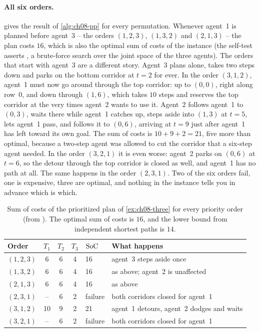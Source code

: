 \paragraph{All six orders.}  gives the result of
\cref{alg:ch08-pp} for every permutation. Whenever agent~1 is planned before agent~3
-- the orders $(1,2,3)$, $(1,3,2)$ and $(2,1,3)$ -- the plan costs $16$, which is also
the optimal sum of costs of the instance (the self-test asserts
, a brute-force search over the joint space of the
three agents). The
orders that start with agent~3 are a different story. Agent~3 plans alone, takes two
steps down and parks on the bottom corridor at $t = 2$ for ever. In the order
$(3,1,2)$, agent~1 must now go around through the top corridor: up to $(0,0)$, right
along row~$0$, and down through $(1,6)$, which takes $10$ steps and reserves the top
corridor at the very times agent~2 wants to use it. Agent~2 follows agent~1 to $(0,3)$,
waits there while agent~1 catches up, steps aside into $(1,3)$ at $t = 5$, lets
agent~1 pass, and follows it to $(0,6)$, arriving at $t = 9$ just after agent~1 has left
toward its own goal. The sum of costs is $10 + 9 + 2 = 21$, five more than optimal,
because a two-step agent was allowed to cut the corridor that a six-step agent needed.
In the order $(3,2,1)$ it is even worse: agent~2 parks on $(0,6)$ at $t = 6$, so the
detour through the top corridor is closed as well, and agent~1 has no path at all. The
same happens in the order $(2,3,1)$. Two of the six orders fail, one is expensive, three
are optimal, and nothing in the instance tells you in advance which is which.

\begin{table}[tb]
  \centering\small
  \caption{Sum of costs of the prioritized plan of \cref{ex:ch08-three} for every
  priority order (from ). The optimal sum of costs is
  $16$, and the lower bound from independent shortest paths is $14$.}
  \label{tab:ch08-orders}
  \begin{tabular}{@{}lcccll@{}}
  \toprule
  Order & $T_1$ & $T_2$ & $T_3$ & $\mathrm{SoC}$ & What happens \\
  \midrule
  $(1,2,3)$ & 6 & 6 & 4 & 16 & agent~3 steps aside once \\
  $(1,3,2)$ & 6 & 6 & 4 & 16 & as above; agent~2 is unaffected \\
  $(2,1,3)$ & 6 & 6 & 4 & 16 & as above \\
  $(2,3,1)$ & -- & 6 & 2 & failure & both corridors closed for agent~1 \\
  $(3,1,2)$ & 10 & 9 & 2 & 21 & agent~1 detours, agent~2 dodges and waits \\
  $(3,2,1)$ & -- & 6 & 2 & failure & both corridors closed for agent~1 \\
  \bottomrule
  \end{tabular}
\end{table}


